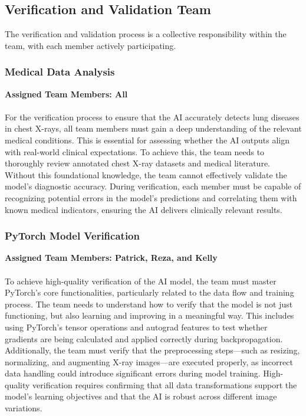 \documentclass[12pt, titlepage]{article}
\begin{document}
\subsection{Verification and Validation Team}

The verification and validation process is a collective responsibility within the team,
with each member actively participating.

\subsubsection{Medical Data Analysis}
\textbf{Assigned Team Members: All} \\\\
For the verification process to ensure that the AI accurately detects lung diseases in chest X-rays, all team members must gain a deep understanding of the relevant medical conditions. This is essential for assessing whether the AI outputs align with real-world clinical expectations. To achieve this, the team needs to thoroughly review annotated chest X-ray datasets and medical literature. Without this foundational knowledge, the team cannot effectively validate the model’s diagnostic accuracy. During verification, each member must be capable of recognizing potential errors in the model’s predictions and correlating them with known medical indicators, ensuring the AI delivers clinically relevant results.
\subsubsection{PyTorch Model Verification} 
\textbf{Assigned Team Members: Patrick, Reza, and Kelly}\\\\
To achieve high-quality verification of the AI model, the team must master PyTorch’s core functionalities, particularly related to the data flow and training process. The team needs to understand how to verify that the model is not just functioning, but also learning and improving in a meaningful way. This includes using PyTorch’s tensor operations and autograd features to test whether gradients are being calculated and applied correctly during backpropagation. Additionally, the team must verify that the preprocessing steps—such as resizing, normalizing, and augmenting X-ray images—are executed properly, as incorrect data handling could introduce significant errors during model training. High-quality verification requires confirming that all data transformations support the model’s learning objectives and that the AI is robust across different image variations.
\end{document}
